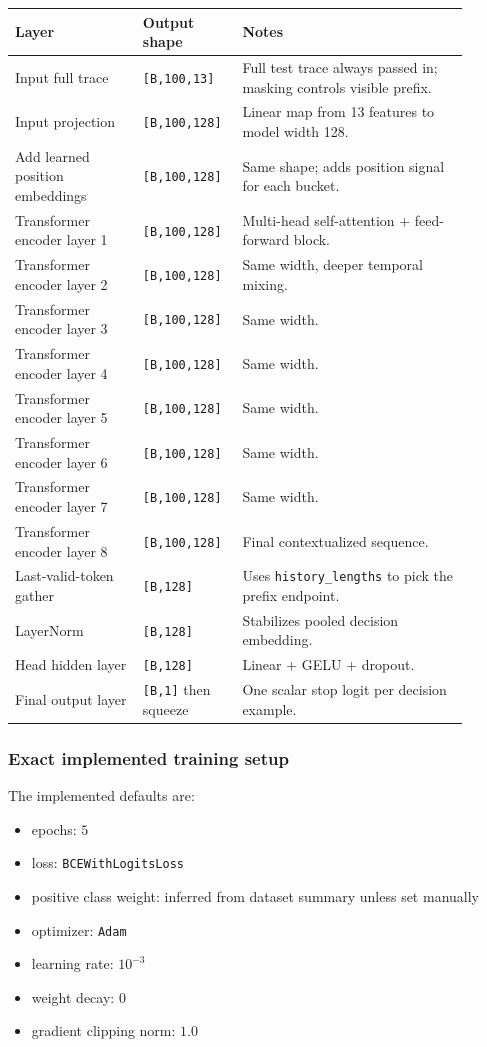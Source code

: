 \documentclass[11pt]{article}
\newcommand{\toprule}{\hline}
\newcommand{\midrule}{\hline}
\newcommand{\bottomrule}{\hline}
\begin{document}
\begin{center}
\begin{tabular}{p{0.26\linewidth} p{0.18\linewidth} p{0.46\linewidth}}
\toprule
\textbf{Layer} & \textbf{Output shape} & \textbf{Notes} \\
\midrule
Input full trace & \texttt{[B,100,13]} & Full test trace always passed in; masking controls visible prefix. \\
Input projection & \texttt{[B,100,128]} & Linear map from 13 features to model width 128. \\
Add learned position embeddings & \texttt{[B,100,128]} & Same shape; adds position signal for each bucket. \\
Transformer encoder layer 1 & \texttt{[B,100,128]} & Multi-head self-attention + feed-forward block. \\
Transformer encoder layer 2 & \texttt{[B,100,128]} & Same width, deeper temporal mixing. \\
Transformer encoder layer 3 & \texttt{[B,100,128]} & Same width. \\
Transformer encoder layer 4 & \texttt{[B,100,128]} & Same width. \\
Transformer encoder layer 5 & \texttt{[B,100,128]} & Same width. \\
Transformer encoder layer 6 & \texttt{[B,100,128]} & Same width. \\
Transformer encoder layer 7 & \texttt{[B,100,128]} & Same width. \\
Transformer encoder layer 8 & \texttt{[B,100,128]} & Final contextualized sequence. \\
Last-valid-token gather & \texttt{[B,128]} & Uses \texttt{history\_lengths} to pick the prefix endpoint. \\
LayerNorm & \texttt{[B,128]} & Stabilizes pooled decision embedding. \\
Head hidden layer & \texttt{[B,128]} & Linear + GELU + dropout. \\
Final output layer & \texttt{[B,1]} then squeeze & One scalar stop logit per decision example. \\
\bottomrule
\end{tabular}
\end{center}

\subsubsection*{Exact implemented training setup}

The implemented defaults are:
\begin{itemize}
\item epochs: \(5\)
\item loss: \texttt{BCEWithLogitsLoss}
\item positive class weight: inferred from dataset summary unless set manually
\item optimizer: \texttt{Adam}
\item learning rate: \(10^{-3}\)
\item weight decay: \(0\)
\item gradient clipping norm: \(1.0\)
\end{itemize}
\end{document}
